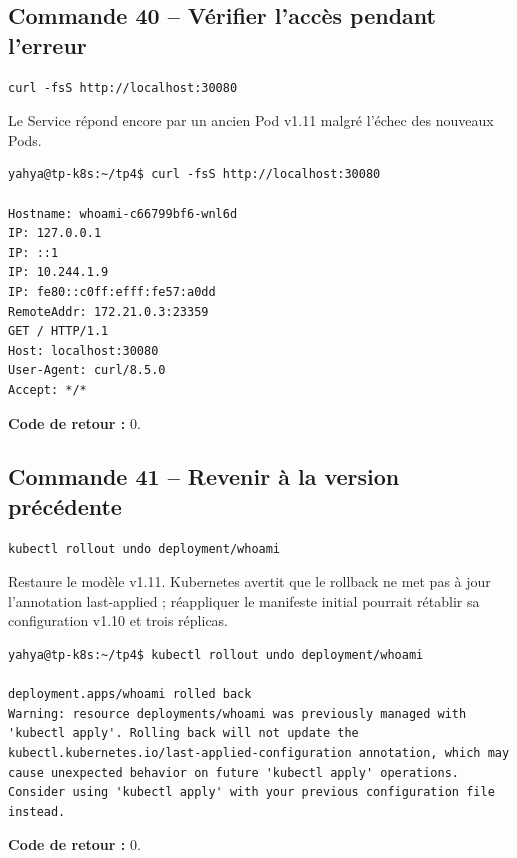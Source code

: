 \documentclass[11pt,a4paper]{article}
\begin{document}
\subsection{Commande 40 -- Vérifier l’accès pendant l’erreur}
\begin{lstlisting}
curl -fsS http://localhost:30080
\end{lstlisting}
Le Service répond encore par un ancien Pod v1.11 malgré l’échec des nouveaux Pods.
\begin{tcolorbox}[terminal,title={Ubuntu / WSL2 -- Commande 40 -- rendu reconstitué}]
\begin{Verbatim}[fontsize=\scriptsize,breaklines=true,breakanywhere=true,breaksymbolleft={},breaksymbolright={}]
yahya@tp-k8s:~/tp4$ curl -fsS http://localhost:30080

Hostname: whoami-c66799bf6-wnl6d
IP: 127.0.0.1
IP: ::1
IP: 10.244.1.9
IP: fe80::c0ff:efff:fe57:a0dd
RemoteAddr: 172.21.0.3:23359
GET / HTTP/1.1
Host: localhost:30080
User-Agent: curl/8.5.0
Accept: */*
\end{Verbatim}
\end{tcolorbox}
\textbf{Code de retour :} 0.

\subsection{Commande 41 -- Revenir à la version précédente}
\begin{lstlisting}
kubectl rollout undo deployment/whoami
\end{lstlisting}
Restaure le modèle v1.11. Kubernetes avertit que le rollback ne met pas à jour l’annotation last-applied ; réappliquer le manifeste initial pourrait rétablir sa configuration v1.10 et trois réplicas.
\begin{tcolorbox}[terminal,title={Ubuntu / WSL2 -- Commande 41 -- rendu reconstitué}]
\begin{Verbatim}[fontsize=\scriptsize,breaklines=true,breakanywhere=true,breaksymbolleft={},breaksymbolright={}]
yahya@tp-k8s:~/tp4$ kubectl rollout undo deployment/whoami

deployment.apps/whoami rolled back
Warning: resource deployments/whoami was previously managed with 'kubectl apply'. Rolling back will not update the kubectl.kubernetes.io/last-applied-configuration annotation, which may cause unexpected behavior on future 'kubectl apply' operations. Consider using 'kubectl apply' with your previous configuration file instead.
\end{Verbatim}
\end{tcolorbox}
\textbf{Code de retour :} 0.
\end{document}
